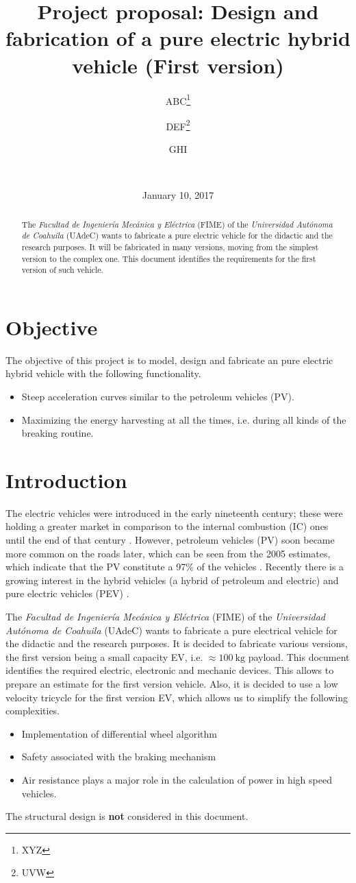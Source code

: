 \documentclass[journal]{IEEEtran}
\title{Project proposal: Design and fabrication of a pure electric hybrid vehicle (First version)}
\date {January 10, 2017}
\author{ABC\thanks{XYZ} \and DEF\thanks{UVW} \and GHI\footnotemark[1]}
\author{\IEEEauthorblockN{S. K. Gadi}
\\ \IEEEauthorblockA{Facultad de Ingeniería Mecánica y Eléctrica\\
Universidad Autónoma de Coahuila \\
Email: gadis@uadec.edu.mx}
}
\begin{document}
\maketitle
\begin {abstract}
The \emph{Facultad de Ingeniería Mecánica y Eléctrica} (FIME) of the \emph{Universidad Autónoma de Coahuila} (UAdeC) wants to fabricate a pure electric vehicle for the didactic and the research purposes. It will be fabricated in many versions, moving from the simplest version to the complex one. This document identifies the requirements for the first version of such vehicle.
\end {abstract}
\section{Objective}
The objective of this project is to model, design and fabricate an pure electric hybrid vehicle with the following functionality.
\begin{itemize}
	\item Steep acceleration curves similar to the petroleum vehicles (PV).
	\item Maximizing the energy harvesting at all the times, i.e. during all kinds of the breaking routine.
\end{itemize}
\section{Introduction}
The electric vehicles were introduced in the early nineteenth century; these were holding a greater market in comparison to the internal combustion (IC) ones until the end of that century \cite{6487583}. However, petroleum vehicles (PV) soon became more common on the roads later, which can be seen from the 2005 estimates, which indicate that the PV constitute a 97\% of the vehicles \cite{de2012electrical}. Recently there is a growing interest in the hybrid vehicles (a hybrid of petroleum and electric) and pure electric vehicles (PEV) \cite{hori2004future, turrentine1995will, SKGadi-2016EuropeReportEV}.

The \emph{Facultad de Ingeniería Mecánica y Eléctrica} (FIME) of the \emph{Universidad Autónoma de Coahuila} (UAdeC) wants to fabricate a pure electrical vehicle for the didactic and the research purposes. It is decided to fabricate various versions, the first version being a small capacity EV, i.e. $\approx \SI{100}{\kilo\gram}$ payload. This document identifies the required electric, electronic and mechanic devices. This allows to prepare an estimate for the first version vehicle. Also, it is decided to use a low velocity tricycle for the first version EV, which allows us to simplify the following complexities.
\begin{itemize}
  \item Implementation of  differential wheel algorithm
  \item Safety associated with the braking mechanism
  \item Air resistance plays a major role in the calculation of power in high speed vehicles.
\end{itemize}
The structural design is \textbf{not} considered in this document.
\end{document}
